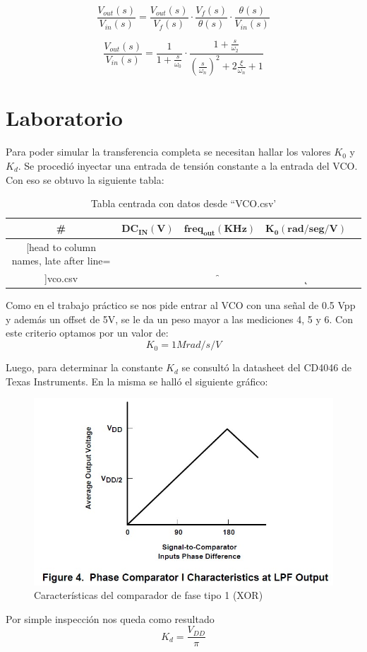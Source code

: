 \documentclass{article}
\begin{document}
\begin{equation} \label{voutvin_eqn}
\frac{V_{out}(s)}{V_{in}(s)} = \frac{V_{out}(s)}{V_f(s)} \cdot \frac{V_f(s)}{\theta(s)}\cdot \frac{\theta(s)}{V_{in}(s)}
\end{equation}

\begin{equation} \label{voutvin_eqn_posta}
\frac{V_{out}(s)}{V_{in}(s)} = \frac{1}{ 1 + \frac{s}{\omega_0}} 
\cdot \frac{ 1 + \frac{s}{\omega_2} }
{ \left(\frac{s}{\omega_n}\right)^2 + 2\frac{\xi}{\omega_n}  + 1} 
\end{equation}

\newpage

\section*{Laboratorio}
Para poder simular la transferencia completa se necesitan hallar los valores $K_0$ y $K_d$.
Se procedió inyectar una entrada de tensión constante a la entrada del VCO. Con eso se obtuvo la siguiente tabla:
\begin{table}[H]
	\centering
	\caption{Tabla centrada con datos desde ``VCO.csv'}
	\label{table7}
	\begin{tabular}{c c c c c}%
		\bfseries \# & $\bm{DC_{IN}(V)}$ & $\bm{freq_{out}(KHz)}$ & $\bm{K_0(rad/seg/V)}$  \\ \hline
		\csvreader[head to column names, late after line=\\]{vco.csv}{}{\thecsvrow & \dc & \f & \k}
		\hline
	\end{tabular}
\end{table}

Como en el trabajo práctico se nos pide entrar al VCO con una señal de 0.5 Vpp y además un offset de 5V, se le da un peso mayor a las mediciones 4, 5 y 6. Con este  criterio optamos por un valor de:
\[ K_0= 1Mrad/s/V \]

Luego, para determinar la constante $K_d$ se consultó la datasheet del CD4046 de Texas Instruments. En la misma se halló el siguiente gráfico:
\begin{figure}[H]
\centering
\includegraphics[width=0.6\linewidth]{images/Kd.jpg}
\caption{Características del comparador de fase tipo 1 (XOR)}
\label{fig:comp1}
\end{figure}
Por simple inspección nos queda como resultado
\[ K_d= \frac{V_{DD}}{\pi} \]
\end{document}
